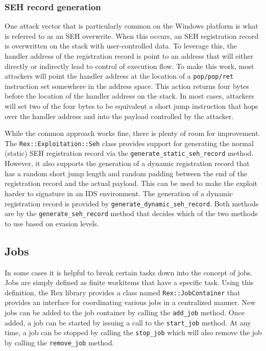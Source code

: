 \documentclass{report}
\begin{document}
            \subsubsection{SEH record generation}

\par
One attack vector that is particularly common on the Windows
platform is what is referred to as an SEH overwrite.  When this
occurs, an SEH registration record is overwritten on the stack with
user-controlled data.  To leverage this, the handler address of the
registration record is point to an address that will either directly
or indirectly lead to control of execution flow.  To make this work,
most attackers will point the handler address at the location of a
\texttt{pop/pop/ret} instruction set somewhere in the address space.
This action returns four bytes before the location of the handler
address on the stack.  In most cases, attackers will set two of the
four bytes to be equivalent a short jump instruction that hops over
the handler address and into the payload controlled by the attacker.

\par
While the common approach works fine, there is plenty of room for
improvement.  The \texttt{Rex::Exploitation::Seh} class provides
support for generating the normal (static) SEH registration record
via the \texttt{generate\_static\_seh\_record} method.  However, it
also supports the generation of a dynamic registration record that
has a random short jump length and random padding between the end of
the registration record and the actual payload.  This can be used to
make the exploit harder to signature in an IDS environment.  The
generation of a dynamic registration record is provided by
\texttt{generate\_dynamic\_seh\_record}.  Both methods are by the
\texttt{generate\_seh\_record} method that decides which of the two
methods to use based on evasion levels.

        \subsection{Jobs}
        \label{rex-jobs}

\par
In some cases it is helpful to break certain tasks down into the
concept of jobs.  Jobs are simply defined as finite workitems that
have a specific task.  Using this definition, the Rex library
provides a class named \texttt{Rex::JobContainer} that provides an
interface for coordinating various jobs in a centralized manner. New
jobs can be added to the job container by calling the
\texttt{add\_job} method.  Once added, a job can be started by
issuing a call to the \texttt{start\_job} method.  At any time, a
job can be stopped by calling the \texttt{stop\_job} which will also
remove the job by calling the \texttt{remove\_job} method.
\end{document}
